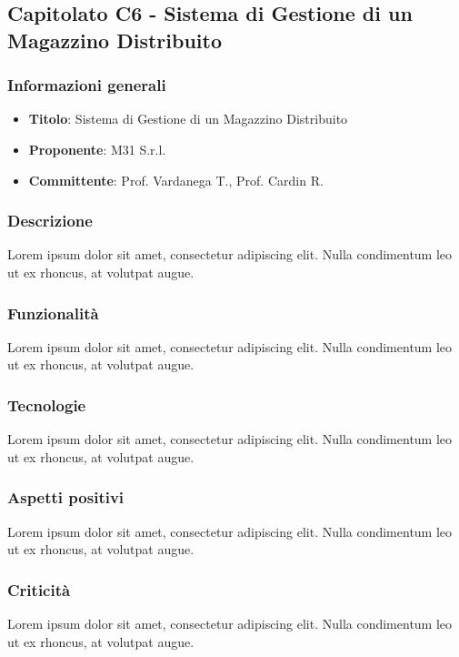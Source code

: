 \subsection{Capitolato C6 - Sistema di Gestione di un Magazzino
Distribuito}
    \subsubsection{Informazioni generali}
        \begin{itemize}
            \item \textbf{Titolo}: Sistema di Gestione di un Magazzino
Distribuito
            \item \textbf{Proponente}: M31 S.r.l.
            \item \textbf{Committente}: Prof. Vardanega T., Prof. Cardin R.
        \end{itemize}
     \subsubsection{Descrizione}
    Lorem ipsum dolor sit amet, consectetur adipiscing elit. Nulla condimentum leo ut ex rhoncus, at volutpat augue.
     \subsubsection{Funzionalità}
    Lorem ipsum dolor sit amet, consectetur adipiscing elit. Nulla condimentum leo ut ex rhoncus, at volutpat augue.
    \subsubsection{Tecnologie}
    Lorem ipsum dolor sit amet, consectetur adipiscing elit. Nulla condimentum leo ut ex rhoncus, at volutpat augue.
    \subsubsection{Aspetti positivi}
    Lorem ipsum dolor sit amet, consectetur adipiscing elit. Nulla condimentum leo ut ex rhoncus, at volutpat augue.
    \subsubsection{Criticità}
    Lorem ipsum dolor sit amet, consectetur adipiscing elit. Nulla condimentum leo ut ex rhoncus, at volutpat augue.